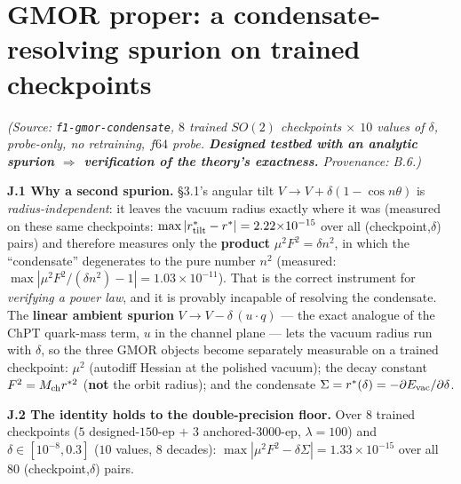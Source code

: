 \documentclass[10pt]{article}
\begin{document}
\section{GMOR proper: a condensate-resolving spurion on trained checkpoints}\label{app:gmor}
\emph{(Source: \texttt{f1-gmor-condensate}, $8$ trained $SO(2)$ checkpoints $\times$ $10$ values of $\delta$, probe-only, no retraining, $f64$ probe. \textbf{Designed testbed with an analytic spurion $\Rightarrow$ verification of the theory's exactness.} Provenance: B.6.)}

\textbf{J.1 Why a second spurion.} \S3.1's angular tilt $V\to V+\delta(1-\cos n\theta)$ is \emph{radius-independent}: it leaves the vacuum radius exactly where it was (measured on these same checkpoints: $\max|r^*_{\rm tilt}-r^*|=2.22{\times}10^{-15}$ over all (checkpoint,$\delta$) pairs) and therefore measures only the \textbf{product} $\mu^2F^2=\delta n^2$, in which the ``condensate'' degenerates to the pure number $n^2$ (measured: $\max|\mu^2F^2/(\delta n^2)-1|=1.03{\times}10^{-11}$). That is the correct instrument for \emph{verifying a power law}, and it is provably incapable of resolving the condensate. The \textbf{linear ambient spurion} $V\to V-\delta\,(u\cdot q)$ --- the exact analogue of the ChPT quark-mass term, $u$ in the channel plane --- lets the vacuum radius run with $\delta$, so the three GMOR objects become separately measurable on a trained checkpoint: $\mu^2$ (autodiff Hessian at the polished vacuum); the decay constant $F^2=M_{\rm ch}r^{*2}$ (\textbf{not} the orbit radius); and the condensate $\Sigma=r^*(\delta)=-\partial E_{\rm vac}/\partial\delta$.

\textbf{J.2 The identity holds to the double-precision floor.} Over $8$ trained checkpoints ($5$ designed-$150$-ep $+$ $3$ anchored-$3000$-ep, $\lambda{=}100$) and $\delta\in[10^{-8},0.3]$ ($10$ values, $8$ decades): $\max|\mu^2F^2-\delta\Sigma|=1.33{\times}10^{-15}$ over all $80$ (checkpoint,$\delta$) pairs.
\end{document}
